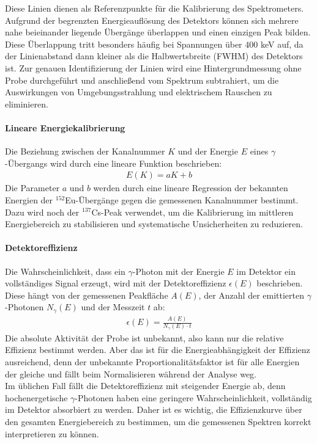 Diese Linien dienen als Referenzpunkte für die Kalibrierung des Spektrometers.
Aufgrund der begrenzten Energieauflösung des Detektors können sich mehrere nahe beieinander liegende Übergänge überlappen und einen einzigen Peak bilden. 
Diese Überlappung tritt besonders häufig bei Spannungen über 400 keV auf, da der Linienabstand dann kleiner als die Halbwertsbreite (FWHM) des Detektors ist.
Zur genauen Identifizierung der Linien wird eine Hintergrundmessung ohne Probe durchgeführt und anschließend vom Spektrum subtrahiert, um die Auswirkungen von Umgebungsstrahlung und elektrischem Rauschen zu eliminieren.
\paragraph{Lineare Energiekalibrierung}
Die Beziehung zwischen der Kanalnummer $K$ und der Energie $E$ eines $\gamma$-Übergangs wird durch eine lineare Funktion beschrieben:
\begin{align}
    E(K) = aK + b
    \label{Gl:kalibrierung}
\end{align}
Die Parameter $a$ und $b$ werden durch eine lineare Regression der bekannten Energien der $^{152}$Eu-Übergänge gegen die gemessenen Kanalnummer bestimmt. \\
Dazu wird noch der $^{137}$Cs-Peak verwendet, um die Kalibrierung im mittleren Energiebereich zu stabilisieren und systematische Unsicherheiten zu reduzieren.
\paragraph{Detektoreffizienz}
Die Wahrscheinlichkeit, dass ein $\gamma$-Photon mit der Energie $E$ im Detektor ein vollständiges Signal erzeugt, wird mit der Detektoreffizienz $\epsilon(E)$ beschrieben. Diese hängt von der gemessenen Peakfläche $A(E)$, der Anzahl der emittierten $\gamma$-Photonen $N_\gamma(E)$ und der Messzeit $t$ ab:
\begin{align*}  \epsilon(E) = \frac{A(E)}{N_\gamma(E) \cdot t}  \end{align*}
Die absolute Aktivität der Probe ist unbekannt, also kann nur die relative Effizienz bestimmt werden. Aber das ist für die Energieabhängigkeit der Effizienz ausreichend, denn der unbekannte Proportionalitätsfaktor ist für alle Energien der gleiche und fällt beim Normalisieren während der Analyse weg.\\
Im üblichen Fall fällt die Detektoreffizienz mit steigender Energie ab, denn hochenergetische $\gamma$-Photonen haben eine geringere Wahrscheinlichkeit, vollständig im Detektor absorbiert zu werden. 
Daher ist es wichtig, die Effizienzkurve über den gesamten Energiebereich zu bestimmen, um die gemessenen Spektren korrekt interpretieren zu können.

